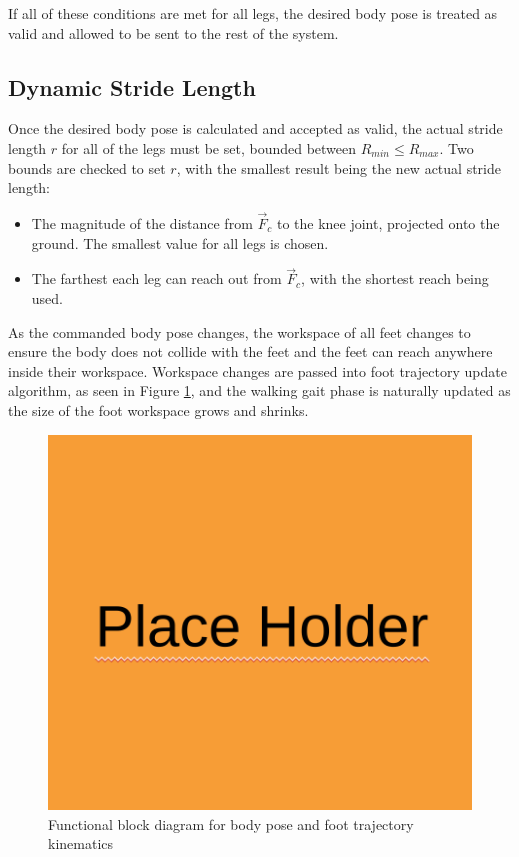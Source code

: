 If all of these conditions are met for all legs, the desired body pose is treated as valid and allowed to be sent to the rest of the system. 

\subsection{ Dynamic Stride Length }

Once the desired body pose is calculated and accepted as valid, the actual stride length $r$ for all of the legs must be set, bounded between $R_{min} \le R_{max}$. Two bounds are checked to set $r$, with the smallest result being the new actual stride length:

\begin{itemize}
    \item The magnitude of the distance from $\vec{F}_c$ to the knee joint, projected onto the ground. The smallest value for all legs is chosen.

    \item The farthest each leg can reach out from $\vec{F}_c$, with the shortest reach being used. 
\end{itemize}

As the commanded body pose changes, the workspace of all feet changes to ensure the body does not collide with the feet and the feet can reach anywhere inside their workspace. Workspace changes are passed into foot trajectory update algorithm, as seen in Figure \ref{fig:pose_kinematics_flow}, and the walking gait phase is naturally updated as the size of the foot workspace grows and shrinks. 

\begin{figure}[H]
    \centerline{\includegraphics[scale=0.3]{place_holder.png}}
    \caption{Functional block diagram for body pose and foot trajectory kinematics}
    \label{fig:pose_kinematics_flow}
\end{figure}

